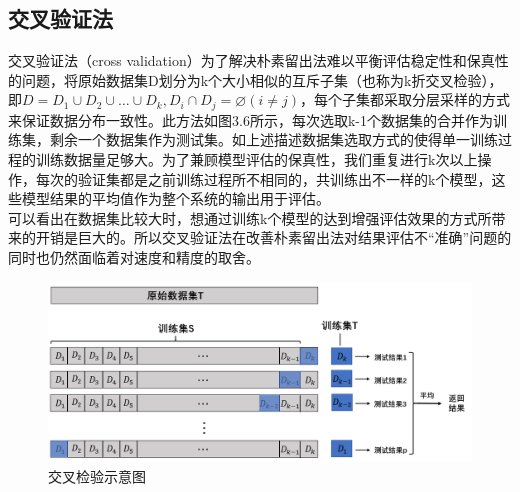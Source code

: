  \subsection{交叉验证法}
 \indent 交叉验证法（cross validation）为了解决朴素留出法难以平衡评估稳定性和保真性的问题，将原始数据集D划分为k个大小相似的互斥子集（也称为k折交叉检验），即$D=D_{1} \cup D_{2} \cup \ldots \cup D_{k}, D_{i} \cap D_{j}=\varnothing(i \neq j)$，每个子集都采取分层采样的方式来保证数据分布一致性。此方法如图3.6所示，每次选取k-1个数据集的合并作为训练集，剩余一个数据集作为测试集。如上述描述数据集选取方式的使得单一训练过程的训练数据量足够大。为了兼顾模型评估的保真性，我们重复进行k次以上操作，每次的验证集都是之前训练过程所不相同的，共训练出不一样的k个模型，这些模型结果的平均值作为整个系统的输出用于评估。\\
 \indent 可以看出在数据集比较大时，想通过训练k个模型的达到增强评估效果的方式所带来的开销是巨大的。所以交叉验证法在改善朴素留出法对结果评估不“准确”问题的同时也仍然面临着对速度和精度的取舍。\\
 \begin{figure}[!h]%
	\centering  %
	\includegraphics[width=\linewidth]{img/cv.jpg}  %
	\caption{交叉检验示意图}  %
	\label{fig:mcmthesis-logo}   %
\end{figure}


